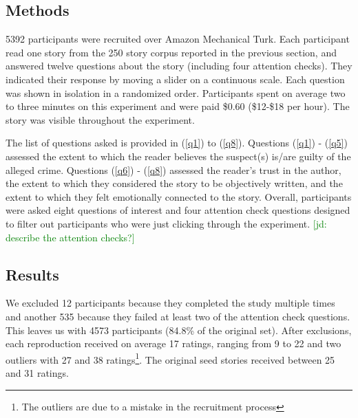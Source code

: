 \documentclass[10pt,letterpaper]{article}
\newcommand{\jd}[1]{\textcolor{Green}{[jd: #1]}}
\begin{document}
\subsection{Methods}
5392 participants were recruited over Amazon Mechanical Turk. Each participant read one story from the 250 story corpus reported in the previous section, and answered twelve questions about the story (including four attention checks). They indicated their response by moving a slider on a continuous scale. Each question was shown in isolation in a randomized order. Participants spent on average two to three minutes on this experiment and were paid \$0.60 (\$12-\$18 per hour). The story was visible throughout the experiment.


The list of questions asked is provided in (\ref{q1}) to (\ref{q8}). Questions (\ref{q1}) - (\ref{q5}) assessed the extent to which the reader believes the suspect(s) is/are guilty of the alleged crime. Questions (\ref{q6}) - (\ref{q8}) assessed the  reader's trust in the author, the extent to which they considered the story to be objectively written, and the extent to which they felt emotionally connected to the story. Overall, participants were asked eight questions of interest and four attention check questions designed to filter out participants who were just clicking through the experiment. \jd{describe the attention checks?}



\subsection{Results}
We excluded 12 participants because they completed the study multiple times and another 535 because they failed at least two of the attention check questions. This leaves us with 4573 participants (84.8\% of the original set). After exclusions, each reproduction received on average 17 ratings, ranging from 9 to 22 and two outliers with 27 and 38 ratings\footnote{The outliers are due to a mistake in the recruitment process}. The original seed stories received between 25 and 31 ratings.
\end{document}
